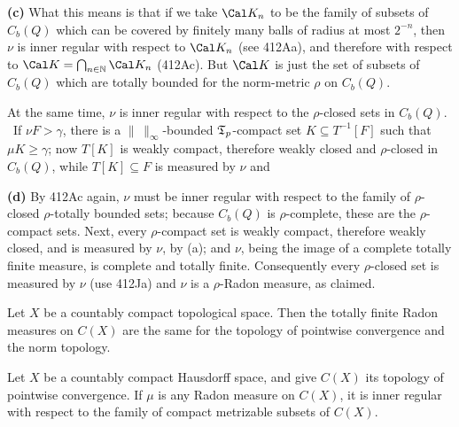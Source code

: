 {\medskip

{\bf (c)} What this means is that if we take $\Cal K_n$ to be the family
of subsets of $C_b(Q)$ which can be covered by finitely many balls of
radius at most $2^{-n}$, then $\nu$ is inner regular with respect
to $\Cal K_n$ (see 412Aa), and therefore with respect to
$\Cal K=\bigcap_{n\in\Bbb N}\Cal K_n$ (412Ac).   But $\Cal K$ is just
the set of subsets of $C_b(Q)$ which are totally bounded for the
norm-metric $\rho$ on $C_b(Q)$.

At the same time, $\nu$ is inner regular with respect to the $\rho$-closed
sets in $C_b(Q)$.   \Prf\ If $\nu F>\gamma$,
there is a $\|\,\|_{\infty}$-bounded $\frak T_p$-compact set
$K\subseteq T^{-1}[F]$ such that $\mu K\ge\gamma$;
now $T[K]$ is weakly compact,
therefore weakly closed and $\rho$-closed in $C_b(Q)$, while
$T[K]\subseteq F$ is measured by $\nu$ and


\medskip

{\bf (d)} By 412Ac again, $\nu$ must be inner regular with respect to the
family of $\rho$-closed $\rho$-totally bounded sets;  because $C_b(Q)$ is
$\rho$-complete, these are the $\rho$-compact sets.   Next, every
$\rho$-compact set is weakly compact, therefore weakly closed, and is
measured by $\nu$, by (a);  and $\nu$, being the image of a complete
totally finite measure, is complete and totally finite.   Consequently
every $\rho$-closed set is measured by $\nu$ (use 412Ja) and $\nu$ is a
$\rho$-Radon measure, as claimed.
}%

 Let $X$ be a countably compact topological space.
Then the totally finite Radon measures on $C(X)$ are the same for the
topology of pointwise convergence and the norm topology.


 Let $X$ be a countably compact Hausdorff space,
and give $C(X)$ its topology of pointwise convergence.   If $\mu$ is any
Radon measure on $C(X)$, it is inner regular with respect to the family
of compact metrizable subsets of $C(X)$.

